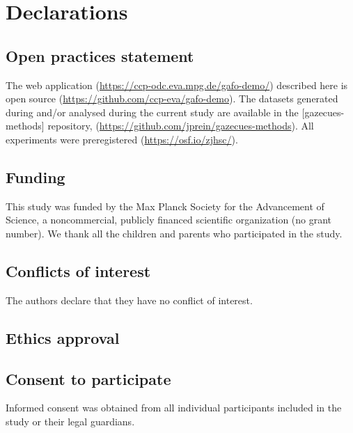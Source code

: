 \documentclass[
  english,
  man,floatsintext]{apa6}
\begin{document}
\hypertarget{declarations}{%
\section{Declarations}\label{declarations}}

\hypertarget{open-practices-statement}{%
\subsection{Open practices statement}\label{open-practices-statement}}

The web application (\url{https://ccp-odc.eva.mpg.de/gafo-demo/}) described here is open source (\url{https://github.com/ccp-eva/gafo-demo}).
The datasets generated during and/or analysed during the current study are available in the {[}gazecues-methods{]} repository, (\url{https://github.com/jprein/gazecues-methods}). All experiments were preregistered (\url{https://osf.io/zjhsc/}).

\hypertarget{funding}{%
\subsection{Funding}\label{funding}}

This study was funded by the Max Planck Society for the Advancement of Science, a noncommercial, publicly financed scientific organization (no grant number). We thank all the children and parents who participated in the study.

\hypertarget{conflicts-of-interest}{%
\subsection{Conflicts of interest}\label{conflicts-of-interest}}

The authors declare that they have no conflict of interest.

\hypertarget{ethics-approval}{%
\subsection{Ethics approval}\label{ethics-approval}}

\hypertarget{consent-to-participate}{%
\subsection{Consent to participate}\label{consent-to-participate}}

Informed consent was obtained from all individual participants included in the study or their legal guardians.
\end{document}
